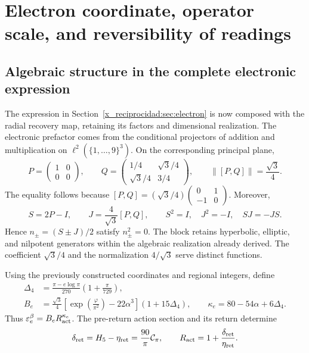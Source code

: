 \chapter{Electron coordinate, operator scale, and reversibility of readings}
\label{x_reciprocidad:rec:recuperacion}

\section{Algebraic structure in the complete electronic expression}

The expression in Section~\ref{x_reciprocidad:sec:electron} is now composed with the radial recovery map, retaining its factors and dimensional realization. The electronic prefactor comes from the conditional projectors of addition and multiplication on \(\ell^2(\{1,\ldots,9\}^3)\). On the corresponding principal plane,
\[
 P=\begin{pmatrix}1&0\\0&0\end{pmatrix},\qquad
 Q=\begin{pmatrix}1/4&\sqrt3/4\\\sqrt3/4&3/4\end{pmatrix},
 \qquad\|[P,Q]\|=\frac{\sqrt3}{4}.
\]
The equality follows because
\([P,Q]=(\sqrt3/4)\left(\begin{smallmatrix}0&1\\-1&0\end{smallmatrix}\right)\).
Moreover,
\[
 S=2P-I,\qquad J=\frac4{\sqrt3}[P,Q],\qquad
 S^2=I,\quad J^2=-I,\quad SJ=-JS.
\]
Hence \(n_\pm=(S\pm J)/2\) satisfy \(n_\pm^2=0\). The block retains hyperbolic, elliptic, and nilpotent generators within the algebraic realization already derived. The coefficient \(\sqrt3/4\) and the normalization \(4/\sqrt3\) serve distinct functions.

Using the previously constructed coordinates and regional integers, define
\begin{align}
 \Delta_4&=\frac{\pi-e\log\pi}{270}\left(1+\frac\pi{729}\right),\nonumber\\
 B_e&=\frac{\sqrt3}{4}
       \left[\exp\!\left(\frac\varphi{\pi^2}\right)-22\alpha^3\right]
       (1+15\Delta_4),\qquad
 \kappa_e=80-54\alpha+6\Delta_4.
 \label{x_reciprocidad:rec:eq:electron-basal}
\end{align}
Thus \(\varepsilon_e^{\beta}=B_eR_{\rm act}^{\kappa_e}\). The pre-return action section and its return determine
\[
 \delta_{\rm ret}=H_5-\eta_{\rm ret}=\frac{90}{\pi}\mathcal C_\pi,
 \qquad R_{\rm act}=1+\frac{\delta_{\rm ret}}{\eta_{\rm ret}}.
\]

